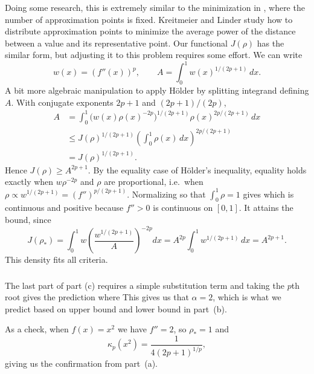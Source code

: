 \documentclass[11pt]{scrartcl}
\begin{document}
\begin{soln}
    Doing some research, this is extremely similar to the minimization in 
    \cite[Remark~4.12]{p3-kreitmeier-linder}, where the number of
    approximation points is fixed. Kreitmeier and Linder study how to distribute approximation
points to minimize the average power of the distance between
a value and its representative point.
Our functional $J(\rho)$ has the similar form, but adjusting it to this problem requires some effort. We 
    can write
    \[
    w(x)=(f''(x))^p,
    \qquad
    A=\int_0^1w(x)^{1/(2p+1)}\,dx.
    \]
    A bit more algebraic manipulation to apply H\"older by splitting integrand 
    defining $A$.
    With conjugate exponents $2p+1$ and $(2p+1)/(2p)$,
    \begin{align*}
        A
        &=\int_0^1
        \bigl(w(x)\rho(x)^{-2p}\bigr)^{1/(2p+1)}
        \rho(x)^{2p/(2p+1)}\,dx\\
        &\le
        J(\rho)^{1/(2p+1)}
        \left(\int_0^1\rho(x)\,dx\right)^{2p/(2p+1)}\\
        &=J(\rho)^{1/(2p+1)}.
    \end{align*}
    Hence $J(\rho)\ge A^{2p+1}$.
By the equality case of H\"older's inequality, equality holds exactly when
$w\rho^{-2p}$ and $\rho$ are proportional, i.e.\ when
$\rho\propto w^{1/(2p+1)}=(f'')^{p/(2p+1)}$. Normalizing so that $\int_0^1\rho=1$ gives
which is continuous and positive because $f''>0$ is continuous on $[0,1]$.
It attains the bound, since
\[
J(\rho_*)
=\int_0^1 w\left(\frac{w^{1/(2p+1)}}{A}\right)^{-2p}dx
=A^{2p}\int_0^1 w^{1/(2p+1)}\,dx
=A^{2p+1}.
\]   
This density fits all criteria.
    \subsubsection*{}
    The last part of part (c) requires a simple substitution term
    and taking the $p$th root gives the prediction
    where
    This gives us that $\alpha=2$, which is what we predict 
    based on upper bound and lower bound in part~(b).

    As a check, when $f(x)=x^2$ we have $f''=2$, so $\rho_*=1$ and
    \[
    \kappa_p(x^2)=\frac{1}{4(2p+1)^{1/p}},
    \]
    giving us the confirmation from part~(a).
\end{soln}
\newpage
\end{document}
